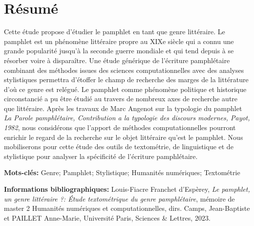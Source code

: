 \section*{Résumé}

Cette étude propose d'étudier le pamphlet en tant que genre littéraire. Le pamphlet est un phénomène littéraire propre au XIXe siècle qui a connu une grande popularité jusqu'à la seconde guerre mondiale et qui tend depuis à se résorber voire à disparaître. Une étude générique de l'écriture pamphlétaire combinant des méthodes issues des sciences computationnelles avec des analyses stylistiques permettra d'étoffer le champ de recherche des marges de la littérature d'où ce genre est relégué. Le pamphlet comme phénomène politique et historique circonstancié a pu être étudié au travers de nombreux axes de recherche autre que littéraire. Après les travaux de Marc Angenot sur la typologie du pamphlet \textit{La Parole pamphlétaire, Contribution a la typologie des discours modernes, Payot, 1982}, nous considérons que l'apport de méthodes computationnelles pourront enrichir le regard de la recherche sur le objet littéraire qu'est le pamphlet. Nous mobiliserons pour cette étude des outils de textométrie, de linguistique et de stylistique pour analyser la spécificité de l'écriture pamphlétaire.

\medskip

\textbf{Mots-clés:} Genre; Pamphlet; Stylistique; Humanités numériques; Textométrie

\textbf{Informations bibliographiques:} Louis-Fiacre Franchet d'Espèrey, \textit{Le pamphlet, un genre littéraire ?: Étude textométrique du genre pamphlétaire}, mémoire de master 2 \og Humanités numériques et computationnelles\fg{}, dirs. Camps, Jean-Baptiste et PAILLET Anne-Marie, Université Paris, Sciences \& Lettres, 2023.

